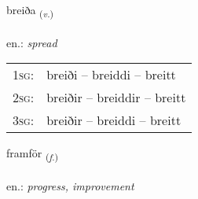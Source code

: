 \documentclass[frontgrid, backgrid]{flacards}\usepackage[]{graphicx}\usepackage[]{xcolor}
\begin{document}
\renewcommand{\flhead}{\vskip5pt \fboxsep=0pt {\small\bfseries\footnotesize Sagnorð | Verb}}
\renewcommand{\fcfoot}{\vskip5pt \fboxsep=0pt \hspace{2pt}{\small\bfseries\footnotesize 2K}}

\renewcommand{\blhead}{\vskip5pt {\small\bfseries\footnotesize Sagnorð | Verb }}
\renewcommand{\bcfoot}{\vskip5pt \hspace{2pt}{\small\bfseries\footnotesize 2K}}


{breiða \small{\textsubscript{(\textit{v.})}} \\[1ex] %
\textphonetic{[preiːða]} \\
en.: \emph{spread} \\  [2ex]
\renewcommand*{\arraystretch}{0.8}
\begin{tabular}{p{1cm}l}
\textsc{1sg}: & breiði -- breiddi -- breitt \\ 
\textsc{2sg}: & breiðir -- breiddir -- breitt \\ 
\textsc{3sg}: & breiðir -- breiddi -- breitt \\ 
\end{tabular}
}

\renewcommand{\flhead}{\vskip5pt \fboxsep=0pt {\small\bfseries\footnotesize Nafnorð | Noun}}
\renewcommand{\fcfoot}{\vskip5pt \fboxsep=0pt \hspace{2pt}{\small\bfseries\footnotesize 2K}}

\renewcommand{\blhead}{\vskip5pt {\small\bfseries\footnotesize Nafnorð | Noun }}
\renewcommand{\bcfoot}{\vskip5pt \hspace{2pt}{\small\bfseries\footnotesize 2K}}


{framför \small{\textsubscript{(\textit{f.})}} \\[1ex] %
\textphonetic{[framfœr]} \\
en.: \emph{progress, improvement} \\  [2ex]
\renewcommand*{\arraystretch}{0.8}
}
\end{document}
